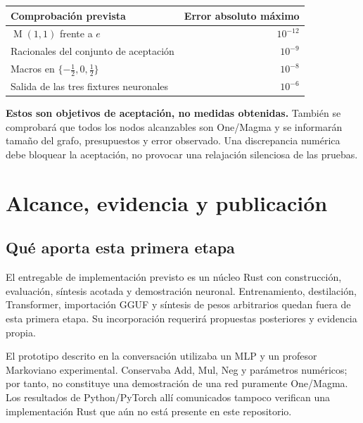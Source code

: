 \documentclass[11pt,a4paper]{article}
\newcommand{\M}{\operatorname{M}}
\begin{document}
\begin{center}
\begin{tabular}{@{}p{88mm}r@{}}
\toprule
\textbf{Comprobación prevista} & \textbf{Error absoluto máximo}\\
\midrule
\(\M(1,1)\) frente a \(e\) & \(10^{-12}\)\\
Racionales del conjunto de aceptación & \(10^{-9}\)\\
Macros en \(\{-\frac12,0,\frac12\}\) & \(10^{-8}\)\\
Salida de las tres fixtures neuronales & \(10^{-6}\)\\
\bottomrule
\end{tabular}
\end{center}

\textbf{Estos son objetivos de aceptación, no medidas obtenidas.}
También se comprobará que todos los nodos alcanzables son One/Magma y se
informarán tamaño del grafo, presupuestos y error observado. Una discrepancia
numérica debe bloquear la aceptación, no provocar una relajación silenciosa
de las pruebas.
\newpage

\section{Alcance, evidencia y publicación}
\subsection{Qué aporta esta primera etapa}
El entregable de implementación previsto es un núcleo Rust con construcción,
evaluación, síntesis acotada y demostración neuronal. Entrenamiento,
destilación, Transformer, importación GGUF y síntesis de pesos arbitrarios
quedan fuera de esta primera etapa. Su incorporación requerirá propuestas
posteriores y evidencia propia.

El prototipo descrito en la conversación utilizaba un MLP y un profesor
Markoviano experimental. Conservaba Add, Mul, Neg y parámetros numéricos;
por tanto, no constituye una demostración de una red puramente One/Magma.
Los resultados de Python/PyTorch allí comunicados tampoco verifican una
implementación Rust que aún no está presente en este repositorio.
\end{document}
